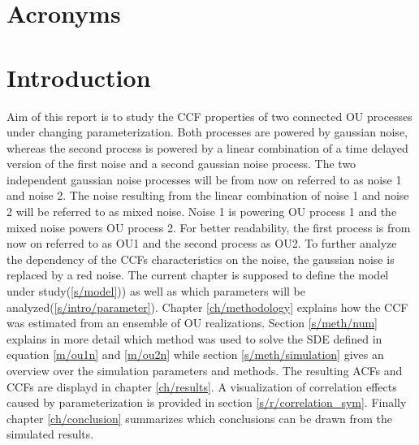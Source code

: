\documentclass[a4paper,12pt,oneside]{book}
\makeatletter
\def\cleardoublepage{\clearpage\if@twoside \ifodd\c@page\else%
  \hbox{}%
  \thispagestyle{empty}%
  \newpage%
  \if@twocolumn\hbox{}\newpage\fi\fi\fi}
\theoremstyle{break}
\makeatother
\begin{document}
\clearpage
\chapter*{Acronyms}
\begin{acronym}[CP-OFDMX] %
\end{acronym}


\mainmatter
\pagestyle{fancy}

\cleardoublepage
\chapter{Introduction}\label{ch/intro}
Aim of this report is to study the \ac{CCF} properties of two connected \ac{OU} processes under changing parameterization.
Both processes are powered by gaussian noise, whereas the second process is powered by a linear combination of a time delayed version of the first noise and a second gaussian noise process. The two independent gaussian noise processes will be from now on referred to as noise 1 and noise 2. The noise resulting from the linear combination of noise 1 and noise 2 will be referred to as mixed noise. Noise 1 is powering \ac{OU} process 1 and the mixed noise powers \ac{OU} process 2. For better readability, the first process is from now on referred to as OU1 and the second process as OU2.
To further analyze the dependency of the \ac{CCF}s characteristics on the noise, the gaussian noise is replaced by a red noise.
The current chapter is supposed to define the model under study(\ref{s/model})) as well as which parameters will be analyzed(\ref{s/intro/parameter}).
Chapter \ref{ch/methodology} explains how the \ac{CCF} was estimated from an ensemble of \ac{OU} realizations. Section \ref{s/meth/num} explains in more detail which method was used to solve the \ac{SDE} defined in equation \ref{m/ou1n} and \ref{m/ou2n} while section \ref{s/meth/simulation} gives an overview over the simulation parameters and methods.
The resulting \ac{ACF}s and \ac{CCF}s are displayd in chapter \ref{ch/results}. A visualization of correlation effects caused by parameterization is provided in section \ref{s/r/correlation_sym}.
Finally chapter \ref{ch/conclusion} summarizes which conclusions can be drawn from the simulated results.
\end{document}
